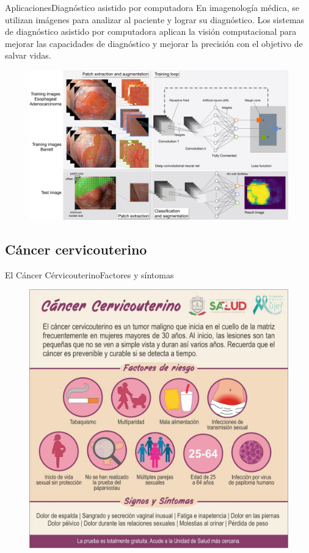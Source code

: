 \documentclass[aspectratio=169,10pt]{beamer}
\begin{document}
\begin{frame}{Aplicaciones}{Diagnóstico asistido por computadora}
  En imagenología médica, se utilizan imágenes para analizar al paciente y lograr su diagnóstico. Los sistemas de diagnóstico asistido por computadora aplican la visión computacional para mejorar las capacidades de diagnóstico y mejorar la precisión con el objetivo de salvar vidas.
  \begin{figure}[]
    \centering
    \includegraphics[height=0.77\textheight]{cad.jpg}
  \end{figure}
\end{frame}



\subsection{Cáncer cervicouterino}

\begin{frame}{El Cáncer Cérvicouterino}{Factores y síntomas}
  \begin{figure}[]
    \centering
    \includegraphics[height=0.95\textheight]{secretaria}
  \end{figure}
\end{frame}
\end{document}
